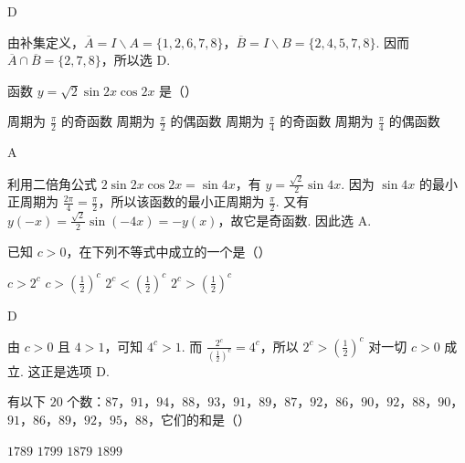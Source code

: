 \begin{answer}
D
\end{answer}

\begin{solution}
由补集定义，\(\overline{A}=I\mathbin{\backslash}A=\{1,2,6,7,8\}\)，\(\overline{B}=I\mathbin{\backslash}B=\{2,4,5,7,8\}\). 因而 \(\overline{A}\cap\overline{B}=\{2,7,8\}\)，所以选 D.
\end{solution}

\begin{problem}
函数 \(y=\sqrt{2}\sin 2x\cos 2x\) 是（\quad）

\choices
    {周期为 \(\frac{\pi}{2}\) 的奇函数}
    {周期为 \(\frac{\pi}{2}\) 的偶函数}
    {周期为 \(\frac{\pi}{4}\) 的奇函数}
    {周期为 \(\frac{\pi}{4}\) 的偶函数}
\end{problem}

\begin{answer}
A
\end{answer}

\begin{solution}
利用二倍角公式 \(2\sin 2x\cos 2x=\sin 4x\)，有 \(y=\frac{\sqrt{2}}{2}\sin 4x\). 因为 \(\sin 4x\) 的最小正周期为 \(\frac{2\pi}{4}=\frac{\pi}{2}\)，所以该函数的最小正周期为 \(\frac{\pi}{2}\). 又有 \(y(-x)=\frac{\sqrt{2}}{2}\sin(-4x)=-y(x)\)，故它是奇函数. 因此选 A.
\end{solution}

\begin{problem}
已知 \(c>0\)，在下列不等式中成立的一个是（\quad）

\choices
    {\(c>2^c\)}
    {\(c>\left(\frac{1}{2}\right)^c\)}
    {\(2^c<\left(\frac{1}{2}\right)^c\)}
    {\(2^c>\left(\frac{1}{2}\right)^c\)}
\end{problem}

\begin{answer}
D
\end{answer}

\begin{solution}
由 \(c>0\) 且 \(4>1\)，可知 \(4^c>1\). 而 \(\displaystyle\frac{2^c}{\left(\frac{1}{2}\right)^c}=4^c\)，所以 \(2^c>\left(\frac{1}{2}\right)^c\) 对一切 \(c>0\) 成立. 这正是选项 D.
\end{solution}

\begin{problem}
有以下 \(20\) 个数：\(87\)，\(91\)，\(94\)，\(88\)，\(93\)，\(91\)，\(89\)，\(87\)，\(92\)，\(86\)，\(90\)，\(92\)，\(88\)，\(90\)，\(91\)，\(86\)，\(89\)，\(92\)，\(95\)，\(88\)，它们的和是（\quad）

\choices
    {\(1789\)}
    {\(1799\)}
    {\(1879\)}
    {\(1899\)}
\end{problem}

